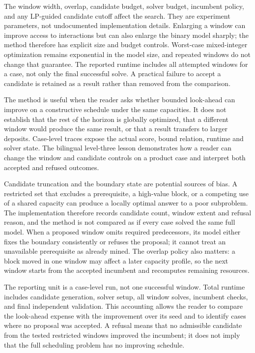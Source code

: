 The window width, overlap, candidate budget, solver budget, incumbent policy, and any LP-guided candidate cutoff affect the search. They are experiment parameters, not undocumented implementation details. Enlarging a window can improve access to interactions but can also enlarge the binary model sharply; the method therefore has explicit size and budget controls. Worst-case mixed-integer optimization remains exponential in the model size, and repeated windows do not change that guarantee. The reported runtime includes all attempted windows for a case, not only the final successful solve. A practical failure to accept a candidate is retained as a result rather than removed from the comparison.

The method is useful when the reader asks whether bounded look-ahead can improve on a constructive schedule under the same capacities. It does not establish that the rest of the horizon is globally optimized, that a different window would produce the same result, or that a result transfers to larger deposits. Case-level traces expose the actual score, bound relation, runtime and solver state. The bilingual level-three lesson demonstrates how a reader can change the window and candidate controls on a product case and interpret both accepted and refused outcomes.

Candidate truncation and the boundary state are potential sources of bias. A restricted set that excludes a prerequisite, a high-value block, or a competing use of a shared capacity can produce a locally optimal answer to a poor subproblem. The implementation therefore records candidate count, window extent and refusal reason, and the method is not compared as if every case solved the same full model. When a proposed window omits required predecessors, its model either fixes the boundary consistently or refuses the proposal; it cannot treat an unavailable prerequisite as already mined. The overlap policy also matters: a block moved in one window may affect a later capacity profile, so the next window starts from the accepted incumbent and recomputes remaining resources.

The reporting unit is a case-level run, not one successful window. Total runtime includes candidate generation, solver setup, all window solves, incumbent checks, and final independent validation. This accounting allows the reader to compare the look-ahead expense with the improvement over its seed and to identify cases where no proposal was accepted. A refusal means that no admissible candidate from the tested restricted windows improved the incumbent; it does not imply that the full scheduling problem has no improving schedule.

